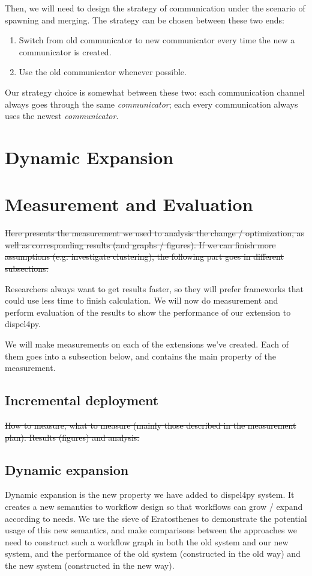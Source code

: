 \documentclass[msc,cs,logo]{infthesis}
\begin{document}
	Then, we will need to design the strategy of communication under the scenario of spawning and merging. The strategy can be chosen between these two ends:
	\begin{enumerate}
		\item Switch from old communicator to new communicator every time the new a communicator is created. 
		\item Use the old communicator whenever possible.  
	\end{enumerate}
	
	Our strategy choice is somewhat between these two: each communication channel always goes through the same \textit{communicator}; each every communication always uses the newest \textit{communicator}. 
	
	\section{Dynamic Expansion}
	
	\section{Measurement and Evaluation}
	\sout{Here presents the measurement we used to analysis the change / optimization, as well as corresponding results (and graphs / figures).
	If we can finish more assumptions (e.g. investigate clustering), the following part goes in different subsections.}
	
	Researchers always want to get results faster, so they will prefer frameworks that could use less time to finish calculation. We will now do measurement and perform evaluation of the results to show the performance of our extension to dispel4py.
	
	We will make measurements on each of the extensions we've created. Each of them goes into a subsection below, and contains the main property of the measurement.
	\subsection{Incremental deployment}
	\sout{How to measure, what to measure  (mainly those described in the measurement plan).
	Results (figures) and analysis.}
	
	\subsection{Dynamic expansion}
	Dynamic expansion is the new property we have added to dispel4py system. It creates a new semantics to workflow design so that workflows can grow / expand according to needs. We use the sieve of Eratosthenes to demonstrate the potential usage of this new semantics, and make comparisons between the approaches we need to construct such a workflow graph in both the old system and our new system, and the performance of the old system (constructed in the old way) and the new system (constructed in the new way).
	
\end{document}

